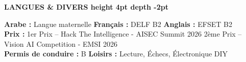 \documentclass[10pt,a4paper]{altacv}
\renewcommand{\cvsection}[2][]{%
  \medskip%
  {\color{heading}\LARGE\bfseries #2 \hspace{0.2em}\leaders\vrule height 4pt depth -2pt\hfill\mbox{}}\par\smallskip
}
\begin{document}
\cvsection{LANGUES \& DIVERS}
\textbf{Arabe :} Langue maternelle \hfill \textbf{Français :} DELF B2 \hfill \textbf{Anglais :} EFSET B2\\[2pt]
\textbf{Prix :} 1er Prix -- Hack The Intelligence - AISEC Summit 2026 \hfill 2ème Prix -- Vision AI Competition - EMSI 2026\\[2pt]
\textbf{Permis de conduire :} B \hfill \textbf{Loisirs :} Lecture, Échecs, Électronique DIY
\end{document}

